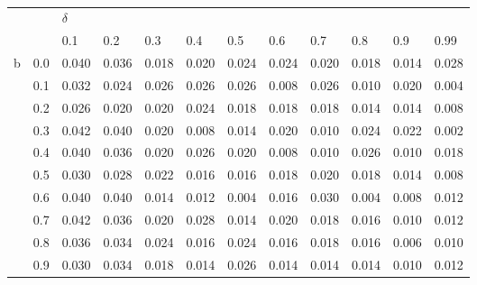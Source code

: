 \documentclass[12pt]{article}
\begin{document}
\begin{table}[ht]
	 \\
	\vspace{0.5cm}
	\centering
	\begin{tabular}{cc|llllllllll}
		& & $\delta$ \\
		& & 0.1 & 0.2 & 0.3 & 0.4 & 0.5 & 0.6 & 0.7 & 0.8 & 0.9 & 0.99 \\
		\hline
			b & 0.0 & 0.040 & 0.036 & 0.018 & 0.020 & 0.024 & 0.024 & 0.020 & 0.018 & 0.014 & 0.028 \\
 			& 0.1 & 0.032 & 0.024 & 0.026 & 0.026 & 0.026 & 0.008 & 0.026 & 0.010 & 0.020 & 0.004 \\
 			& 0.2 & 0.026 & 0.020 & 0.020 & 0.024 & 0.018 & 0.018 & 0.018 & 0.014 & 0.014 & 0.008 \\
			& 0.3 & 0.042 & 0.040 & 0.020 & 0.008 & 0.014 & 0.020 & 0.010 & 0.024 & 0.022 & 0.002 \\
			& 0.4 & 0.040 & 0.036 & 0.020 & 0.026 & 0.020 & 0.008 & 0.010 & 0.026 & 0.010 & 0.018 \\
			& 0.5 & 0.030 & 0.028 & 0.022 & 0.016 & 0.016 & 0.018 & 0.020 & 0.018 & 0.014 & 0.008 \\
			& 0.6 & 0.040 & 0.040 & 0.014 & 0.012 & 0.004 & 0.016 & 0.030 & 0.004 & 0.008 & 0.012 \\
			& 0.7 & 0.042 & 0.036 & 0.020 & 0.028 & 0.014 & 0.020 & 0.018 & 0.016 & 0.010 & 0.012 \\
			& 0.8 & 0.036 & 0.034 & 0.024 & 0.016 & 0.024 & 0.016 & 0.018 & 0.016 & 0.006 & 0.010 \\
			& 0.9 & 0.030 & 0.034 & 0.018 & 0.014 & 0.026 & 0.014 & 0.014 & 0.014 & 0.010 & 0.012 \\

\end{tabular}
\end{table}
\end{document}
